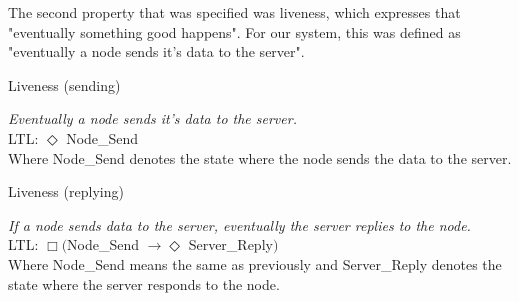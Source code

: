 
The second property that was specified was liveness, which expresses that "eventually something good happens". For our system, this was defined as "eventually a node sends it's data to the server".

\begin{definition}{}{}
Liveness (sending)

\textit{Eventually a node sends it's data to the server.} \\

LTL: $\Diamond$ Node\_Send \\

Where Node\_Send denotes the state where the node sends the data to the server. \\
\end{definition} 

\begin{definition}{}{}
Liveness (replying)

\textit{If a node sends data to the server, eventually the server replies to the node.} \\

LTL: $\Box ($Node\_Send $\rightarrow \Diamond$ Server\_Reply$)$ \\

Where Node\_Send means the same as previously and Server\_Reply denotes the state where the server responds to the node.
\end{definition}


